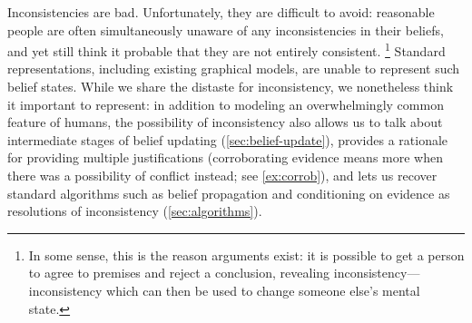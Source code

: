 \documentclass{article}
\newcommand\changed[1]{{\color{note-fg} #1}}
\begin{document}
	Inconsistencies are bad. Unfortunately, they are difficult to avoid: reasonable people are often simultaneously unaware of any inconsistencies in their beliefs, and yet still think it probable that they are not entirely consistent.%
		\footnote{In some sense, this is the reason arguments exist: it is possible to get a person to agree to premises and reject a conclusion, revealing inconsistency---inconsistency which can then be used to change someone else's mental state. }
	\changed{
	Standard representations, including existing graphical models, are unable to represent such belief states.
	While we share the distaste for inconsistency, we nonetheless think it important to represent: in addition to modeling an overwhelmingly common feature of humans, the possibility of inconsistency also	
	allows us to talk about intermediate stages of belief updating (\cref{sec:belief-update}), 
	provides a rationale for providing multiple justifications (corroborating evidence means more when there was a possibility of conflict instead; see \cref{ex:corrob}),
	and	lets us recover standard algorithms such as belief propagation and conditioning on evidence as resolutions of inconsistency (\cref{sec:algorithms}). 
	}
		
	
	
	
\end{document}
